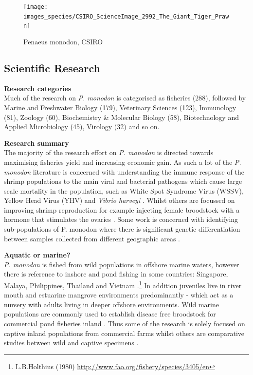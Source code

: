 \documentclass[]{book}
\let\rmarkdownfootnote\footnote%
\def\footnote{\protect\rmarkdownfootnote}
\theoremstyle{definition}
\theoremstyle{definition}
\theoremstyle{definition}
\theoremstyle{remark}
\begin{document}
\begin{figure}

{\centering \texttt{[image: images\_species/CSIRO\_ScienceImage\_2992\_The\_Giant\_Tiger\_Prawn]} 

}

\caption{Penaeus monodon, CSIRO}\label{fig:unnamed-chunk-8}
\end{figure}

\hypertarget{scientific-research-6}{%
\subsection{Scientific Research}\label{scientific-research-6}}

\textbf{Research categories}\\
Much of the research on \emph{P. monodon} is categorised as fisheries
(288), followed by Marine and Freshwater Biology (179), Veterinary
Sciences (123), Immunology (81), Zoology (60), Biochemistry \& Molecular
Biology (58), Biotechnology and Applied Microbiology (45), Virology (32)
and so on.

\textbf{Research summary}\\
The majority of the research effort on \emph{P. monodon} is directed
towards maximising fisheries yield and increasing economic gain. As such
a lot of the \emph{P. monodon} literature is concerned with
understanding the immune response of the shrimp populations to the main
viral and bacterial pathogens which cause large scale mortality in the
population, such as White Spot Syndrome Virus (WSSV), Yellow Head Virus
(YHV) and \emph{Vibrio harveyi} \citep{Ponprateep_2011, Jaree_2012}.
Whilst others are focussed on improving shrimp reproduction for example
injecting female broodstock with a hormone that stimulates the ovaries
\citep{Sathapondecha_2015}. Some work is concerned with identifying
sub-populations of P. monodon where there is significant genetic
differentiation between samples collected from different geographic
areas \citep{Supungul_2000}.

\textbf{Aquatic or marine?}\\
\emph{P. monodon} is fished from wild populations in offshore marine
waters, however there is reference to inshore and pond fishing in some
countries: Singapore, Malaya, Philippines, Thailand and Vietnam
\citep{Engle_2017}.\footnote{L.B.Holthius (1980)
  \url{http://www.fao.org/fishery/species/3405/en}} In addition
juveniles live in river mouth and estuarine mangrove environments
predominantly - which act as a nursery with adults living in deeper
offshore environments. Wild marine populations are commonly used to
establish disease free broodstock for commercial pond fisheries inland
\citep{Claydon_2010}. Thus some of the research is solely focused on
captive inland populations from commercial farms whilst others are
comparative studies between wild and captive specimens
\citep{Caipang_2010}.
\end{document}
